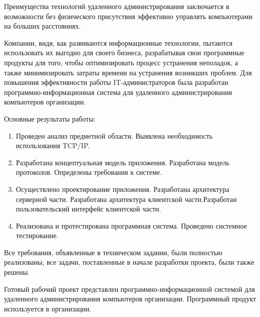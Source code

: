 \newsection
{}

Преимущества технологий удаленного администрирования заключается в возможности без физического присутствия эффективно управлять компьютерами на больших расстояниях.
  
Компании, видя, как развиваются информационные технологии, пытаются использовать их выгодно для своего бизнеса, разрабатывая свои программные продукты для того, чтобы оптимизировать процесс устранения неполадок, а также минимизировать затраты времени на устранения возникших проблем. 
Для повышения эффективности работы IT-администраторов была разработан программно-информационная система для удаленного администрирования компьютеров организации.

Основные результаты работы:

\begin{enumerate}
\item Проведен анализ предметной области. Выявлена необходимость использования TCP/IP.
\item Разработана концептуальная модель приложения. Разработана модель протоколов. Определены требования к системе.
\item Осуществлено проектирование приложения. Разработана архитектура серверной части. Разработана архитектура клиентской части.Разработан пользовательский интерфейс клиентской части.
\item Реализована и протестирована программная система. Проведено системное тестирование.
\end{enumerate}

Все требования, объявленные в техническом задании, были полностью реализованы, все задачи, поставленные в начале разработки проекта, были также решены.

Готовый рабочий проект представлен программно-информационной системой для удаленного администрирования компьютеров организации. Программный продукт используется в организации.
